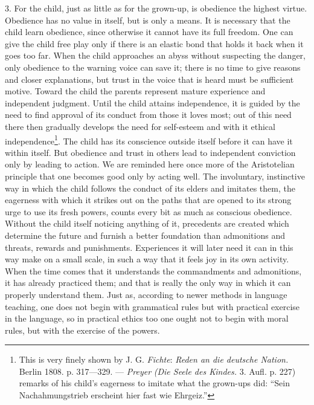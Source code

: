 \documentclass[12pt,a4paper,openany]{book}
\newcommand{\opage}[1]{\marginnote{\footnotesize\textit{[#1]}}}
\begin{document}
3. For the child, just as little as for the grown-up, is obedience
\opage{332}the highest virtue. Obedience has no value in itself, but is only a means. It is necessary that the child
learn obedience, since otherwise it cannot have its full freedom. One can give the child free play only if there is an
elastic bond that holds it back when it goes too far. When the child approaches an abyss without suspecting the danger,
only obedience to the warning voice can save it; there is no time to give reasons and closer explanations, but trust in
the voice that is heard must be sufficient motive. Toward the child the parents represent mature experience and
independent judgment. Until the child attains independence, it is guided by the need to find approval of its conduct
from those it loves most; out of this need there then gradually develops the need for self-esteem and with it ethical
independence\footnote[1]{This is very finely shown by J. G. \emph{Fichte}: \textit{Reden an die deutsche Nation.}
Berlin 1808. p. 317---329. --- \emph{Preyer} \textit{(Die Seele des Kindes.} 3. Aufl. p. 227) remarks of his child's
eagerness to imitate what the grown-ups did: ``Sein Nachahmungstrieb erscheint hier fast wie Ehrgeiz.''}. The child has
its conscience outside itself before it can have it within itself. But obedience and trust in others lead to independent
conviction only by leading to action. We are reminded here once more of the Aristotelian principle that one becomes good
only by acting well. The involuntary, instinctive way in which the child follows the conduct of its elders and imitates
them, the eagerness with which it strikes out on the paths that are opened to its strong urge to use its fresh powers,
counts every bit as much as conscious obedience. Without the child itself noticing anything of it, precedents are created
which determine the future and furnish a better foundation than admonitions and threats, rewards and punishments.
Experiences it will later need it can in this way make on a small scale, in such a way that it feels joy in its own
activity. When the time comes that it understands the commandments and admonitions, it has already practiced them; and
that is really the only way in which it can properly understand them. Just as, according to newer methods in language
teaching, one does not begin with grammatical rules but with practical exercise in the language,
\opage{333}so in practical ethics too one ought not to begin with moral rules, but with the exercise of the powers.
\end{document}
